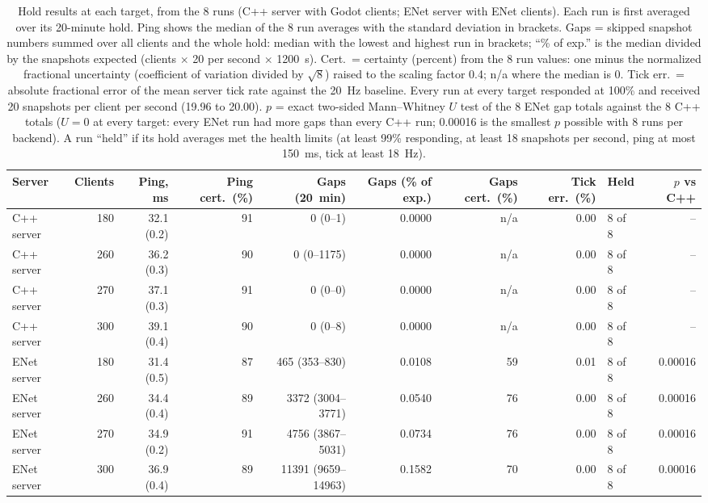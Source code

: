 \documentclass[11pt]{article}
\begin{document}
\begin{table}[H]
\centering
\scriptsize
\setlength{\tabcolsep}{3pt}
\begin{tabular}{@{}lrrrrrrrlr@{}}
\toprule
Server & Clients & Ping, ms & Ping cert.\ (\%) & Gaps (20~min) & Gaps (\% of exp.) & Gaps cert.\ (\%) & Tick err.\ (\%) & Held & $p$ vs C++ \\
\midrule
C++ server & 180 & 32.1 (0.2) & 91 & 0 (0--1) & 0.0000 & n/a & 0.00 & 8 of 8 & -- \\
C++ server & 260 & 36.2 (0.3) & 90 & 0 (0--1175) & 0.0000 & n/a & 0.00 & 8 of 8 & -- \\
C++ server & 270 & 37.1 (0.3) & 91 & 0 (0--0) & 0.0000 & n/a & 0.00 & 8 of 8 & -- \\
C++ server & 300 & 39.1 (0.4) & 90 & 0 (0--8) & 0.0000 & n/a & 0.00 & 8 of 8 & -- \\
\midrule
ENet server & 180 & 31.4 (0.5) & 87 & 465 (353--830) & 0.0108 & 59 & 0.01 & 8 of 8 & 0.00016 \\
ENet server & 260 & 34.4 (0.4) & 89 & 3372 (3004--3771) & 0.0540 & 76 & 0.00 & 8 of 8 & 0.00016 \\
ENet server & 270 & 34.9 (0.2) & 91 & 4756 (3867--5031) & 0.0734 & 76 & 0.00 & 8 of 8 & 0.00016 \\
ENet server & 300 & 36.9 (0.4) & 89 & 11391 (9659--14963) & 0.1582 & 70 & 0.00 & 8 of 8 & 0.00016 \\
\bottomrule
\end{tabular}
\caption{Hold results at each target, from the 8 runs (C++ server with Godot clients; ENet server with ENet clients). Each run is first averaged over its 20-minute hold. Ping shows the median of the 8 run averages with the standard deviation in brackets. Gaps = skipped snapshot numbers summed over all clients and the whole hold: median with the lowest and highest run in brackets; ``\% of exp.'' is the median divided by the snapshots expected (clients $\times$ 20 per second $\times$ 1200~s). Cert.\ = certainty (percent) from the 8 run values: one minus the normalized fractional uncertainty (coefficient of variation divided by $\sqrt{8}$) raised to the scaling factor 0.4; n/a where the median is 0. Tick err.\ = absolute fractional error of the mean server tick rate against the 20~Hz baseline. Every run at every target responded at 100\% and received 20 snapshots per client per second (19.96 to 20.00). $p$ = exact two-sided Mann--Whitney $U$ test of the 8 ENet gap totals against the 8 C++ totals ($U=0$ at every target: every ENet run had more gaps than every C++ run; 0.00016 is the smallest $p$ possible with 8 runs per backend). A run ``held'' if its hold averages met the health limits (at least 99\% responding, at least 18 snapshots per second, ping at most 150~ms, tick at least 18~Hz).}
\label{tab:holdsum}
\end{table}
\end{document}

